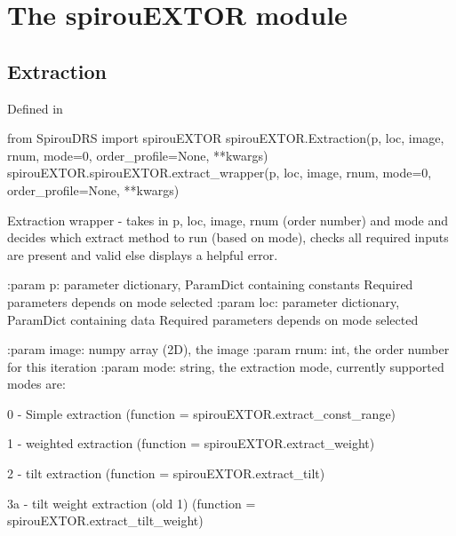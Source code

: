 
\clearpage
\newpage
\noindent\begin{minipage}{\textwidth}
\section{The spirouEXTOR module}
\label{ch:the_module:spirouEXTOR}

\subsection{Extraction}

Defined in \spirouEXTOR{}

\begin{pythonbox}
from SpirouDRS import spirouEXTOR
spirouEXTOR.Extraction(p, loc, image, rnum, mode=0, order_profile=None, **kwargs)
spirouEXTOR.spirouEXTOR.extract_wrapper(p, loc, image, rnum, mode=0, order_profile=None, **kwargs)
\end{pythonbox}

\begin{pythondocstring}
Extraction wrapper - takes in p, loc, image, rnum (order number) and mode
and decides which extract method to run (based on mode), checks all
required inputs are present and valid else displays a helpful error.

:param p: parameter dictionary, ParamDict containing constants
        Required parameters depends on mode selected
:param loc: parameter dictionary, ParamDict containing data
        Required parameters depends on mode selected

:param image: numpy array (2D), the image
:param rnum: int, the order number for this iteration
:param mode: string, the extraction mode, currently supported modes are:

        0 - Simple extraction
                (function = spirouEXTOR.extract_const_range)

        1 - weighted extraction
                (function = spirouEXTOR.extract_weight)

        2 - tilt extraction
                (function = spirouEXTOR.extract_tilt)

        3a - tilt weight extraction (old 1)
                (function = spirouEXTOR.extract_tilt_weight)


\end{pythondocstring}
\end{minipage}
